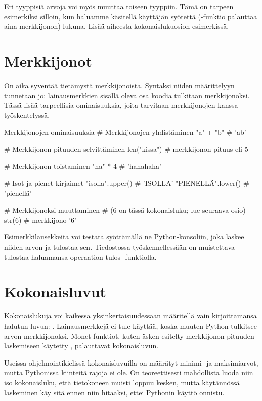 Eri tyyppisiä arvoja voi myös muuttaa toiseen tyyppiin. Tämä on tarpeen esimerkiksi silloin, kun haluamme käsitellä käyttäjän syötettä (-funktio palauttaa aina merkkijonon) lukuna. Lisää aiheesta kokonaislukuosion esimerkissä.

\section{Merkkijonot}

On aika syventää tietämystä merkkijonoista. Syntaksi niiden määrittelyyn tunnetaan jo: lainausmerkkien sisällä oleva osa koodia tulkitaan merkkijonoksi. Tässä lisää tarpeellisia ominaisuuksia, joita tarvitaan merkkijonojen kanssa työskentelyssä.

\begin{example}{Merkkijonojen ominaisuuksia}
# Merkkijonojen yhdistäminen
"a" + "b" # 'ab'

# Merkkijonon pituuden selvittäminen
len("kissa") # merkkijonon pituus eli 5

# Merkkijonon toistaminen
"ha" * 4 # 'hahahaha'

# Isot ja pienet kirjaimet
"isolla".upper() # 'ISOLLA'
"PIENELLÄ".lower() # 'pienellä'

# Merkkijonoksi muuttaminen
# (6 on tässä kokonaisluku; lue seuraava osio)
str(6) # merkkijono '6'
\end{example}

Esimerkkilausekkeita voi testata syöttämällä ne Python-konsoliin, joka laskee niiden arvon ja tulostaa sen. Tiedostossa työskennellessään on muistettava tulostaa haluamansa operaation tulos -funktiolla.

\section{Kokonaisluvut}

Kokonaislukuja voi kaikessa yksinkertaisuudessaan määritellä vain kirjoittamansa halutun luvun: . Lainausmerkkejä ei tule käyttää, koska muuten Python tulkitsee arvon merkkijonoksi. Monet funktiot, kuten äsken esitelty merkkijonon pituuden laskemiseen käytetty , palauttavat kokonaisluvun.

Useissa ohjelmointikielissä kokonaisluvuilla on määrätyt minimi- ja maksimiarvot, mutta Pythonissa kiinteitä rajoja ei ole. On teoreettisesti mahdollista luoda niin iso kokonaisluku, että tietokoneen muisti loppuu kesken, mutta käytännössä laskeminen käy sitä ennen niin hitaaksi, ettei Pythonin käyttö onnistu.

